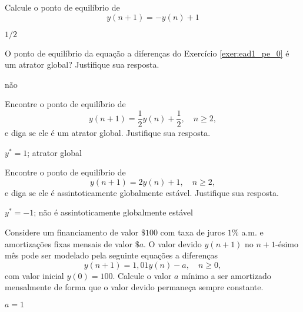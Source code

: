 \begin{exer}\label{exer:ead1_pe_0}
  Calcule o ponto de equilíbrio de
  \begin{equation}
    y(n+1) = -y(n) + 1 
  \end{equation}
\end{exer}
\begin{resp}
  $1/2$
\end{resp}

\begin{exer}
  O ponto de equilíbrio da equação a diferenças do Exercício \ref{exer:ead1_pe_0} é um atrator global? Justifique sua resposta.
\end{exer}
\begin{resp}
  não
\end{resp}

\begin{exer}
  Encontre o ponto de equilíbrio de
  \begin{equation}
    y(n+1) = \frac{1}{2}y(n) + \frac{1}{2},\quad n\geq 2,
  \end{equation}
  e diga se ele é um atrator global. Justifique sua resposta.
\end{exer}
\begin{resp}
  $y^*=1$; atrator global
\end{resp}

\begin{exer}
  Encontre o ponto de equilíbrio de
  \begin{equation}
    y(n+1) = 2y(n) + 1,\quad n\geq 2,
  \end{equation}
  e diga se ele é assintoticamente globalmente estável. Justifique sua resposta.
\end{exer}
\begin{resp}
  $y^*=-1$; não é assintoticamente globalmente estável
\end{resp}

\begin{exer}
  Considere um financiamento de valor $\$ 100$ com taxa de juros $1\%$ a.m. e amortizações fixas mensais de valor $\$ a$. O valor devido $y(n+1)$ no $n+1$-ésimo mês pode ser modelado pela seguinte equações a diferenças
  \begin{equation}
    y(n+1) = 1,01y(n)-a,\quad n\geq 0,
  \end{equation}
  com valor inicial $y(0)=100$. Calcule o valor $a$ mínimo a ser amortizado mensalmente de forma que o valor devido permaneça sempre constante.
\end{exer}
\begin{resp}
  $a=1$
\end{resp}

